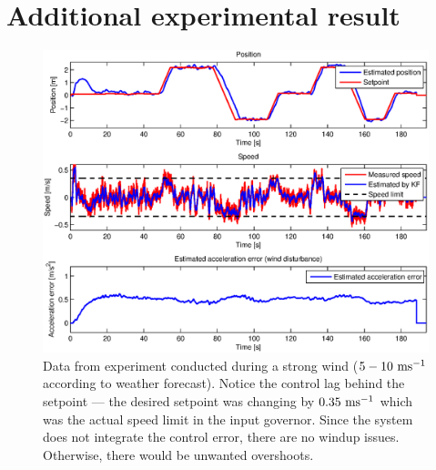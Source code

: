 \section{Additional experimental result}\label{ape:experiments}
\begin{figure}[H]
\centering
\begin{sideways}
\includegraphics[scale=0.99]{fig/experiment_vitr_venku.eps}
\end{sideways}
\caption*{Data from experiment conducted during a strong wind ($5 - 10~\mathrm{ms^{-1}}$ according to weather forecast). Notice the control lag behind the setpoint --- the desired setpoint was changing by $0.35~\mathrm{ms^{-1}}$ which was the actual speed limit in the input governor. Since the system does not integrate the control error, there are no windup issues. Otherwise, there would be unwanted overshoots.}
\end{figure}